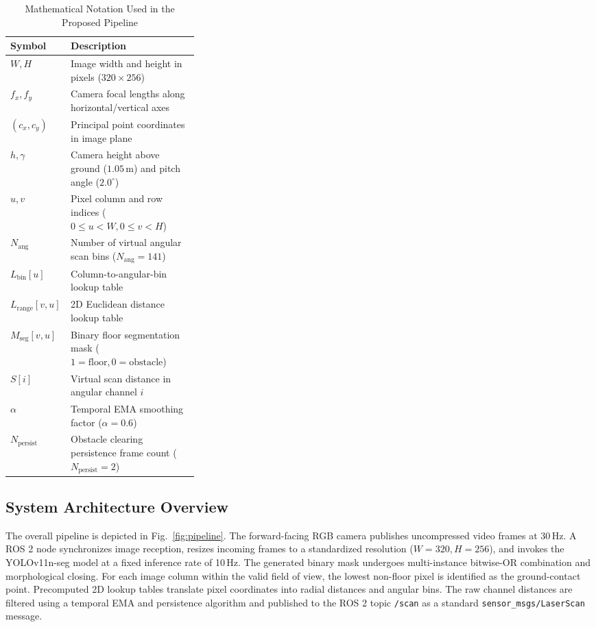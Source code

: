 \documentclass[preprint,12pt]{elsarticle}
\begin{document}
\begin{table}[t]
  \centering
  \caption{Mathematical Notation Used in the Proposed Pipeline}
  \label{tab:notation}
  \begin{tabularx}{\linewidth}{@{}p{0.32\linewidth}X@{}}
    \toprule
    Symbol & Description \\
    \midrule
    $W, H$ & Image width and height in pixels ($320 \times 256$) \\
    $f_x, f_y$ & Camera focal lengths along horizontal/vertical axes \\
    $(c_x, c_y)$ & Principal point coordinates in image plane \\
    $h, \gamma$ & Camera height above ground ($1.05$\,m) and pitch angle ($2.0^\circ$) \\
    $u, v$ & Pixel column and row indices ($0 \le u < W, 0 \le v < H$) \\
    $N_{\mathrm{ang}}$ & Number of virtual angular scan bins ($N_{\mathrm{ang}} = 141$) \\
    $L_{\mathrm{bin}}[u]$ & Column-to-angular-bin lookup table \\
    $L_{\mathrm{range}}[v, u]$ & 2D Euclidean distance lookup table \\
    $M_{\mathrm{seg}}[v, u]$ & Binary floor segmentation mask ($1=\text{floor}, 0=\text{obstacle}$) \\
    $S[i]$ & Virtual scan distance in angular channel $i$ \\
    $\alpha$ & Temporal EMA smoothing factor ($\alpha = 0.6$) \\
    $N_{\mathrm{persist}}$ & Obstacle clearing persistence frame count ($N_{\mathrm{persist}} = 2$) \\
    \bottomrule
  \end{tabularx}
\end{table}

\subsection{System Architecture Overview}
The overall pipeline is depicted in Fig.~\ref{fig:pipeline}. The forward-facing RGB camera publishes uncompressed video frames at 30\,Hz. A ROS 2 node synchronizes image reception, resizes incoming frames to a standardized resolution ($W=320, H=256$), and invokes the YOLOv11n-seg model at a fixed inference rate of 10\,Hz. The generated binary mask undergoes multi-instance bitwise-OR combination and morphological closing. For each image column within the valid field of view, the lowest non-floor pixel is identified as the ground-contact point. Precomputed 2D lookup tables translate pixel coordinates into radial distances and angular bins. The raw channel distances are filtered using a temporal EMA and persistence algorithm and published to the ROS 2 topic \texttt{/scan} as a standard \texttt{sensor\_msgs/LaserScan} message.
\end{document}
